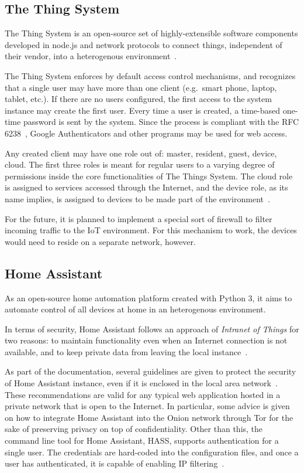 \documentclass[12pt]{article}
\begin{document}
\subsection{The Thing System}

The Thing System is an open-source set of highly-extensible software components developed in node.js and network protocols to connect things, independent of their vendor, into a heterogenous environment~\cite{related_08}.

The Thing System enforces by default access control mechanisms, and recognizes that a single user may have more than one client (e.g.\ smart phone, laptop, tablet, etc.). If there are no users configured, the first access to the system instance may create the first user. Every time a user is created, a time-based one-time password is sent by the system. Since the process is compliant with the RFC 6238~\cite{RFC6238}, Google Authenticators and other programs may be used for web access.

Any created client may have one role out of: master, resident, guest, device, cloud. The first three roles is meant for regular users to a varying degree of permissions inside the core functionalities of The Things System. The cloud role is assigned to services accessed through the Internet, and the device role, as its name implies, is assigned to devices to be made part of the environment~\cite{related_08}. 

For the future, it is planned to implement a special sort of firewall to filter incoming traffic to the IoT environment. For this mechanism to work, the devices would need to reside on a separate network, however.

\subsection{Home Assistant}

As an open-source home automation platform created with Python 3, it aims to automate control of all devices at home in an heterogenous environment.

In terms of security, Home Assistant follows an approach of \emph{Intranet of Things} for two reasons: to maintain functionality even when an Internet connection is not available, and to keep private data from leaving the local instance~\cite{related_11}.

As part of the documentation, several guidelines are given to protect the security of Home Assistant instance, even if it is enclosed in the local area network~\cite{related_12}. These recommendations are valid for any typical web application hosted in a private network that is open to the Internet. In particular, some advice is given on how to integrate Home Assistant into the Onion network through Tor for the sake of preserving privacy on top of confidentiality. Other than this, the command line tool for Home Assistant, HASS, supports authentication for a single user. The credentials are hard-coded into the configuration files, and once a user has authenticated, it is capable of enabling IP filtering~\cite{related_10}.
\end{document}
